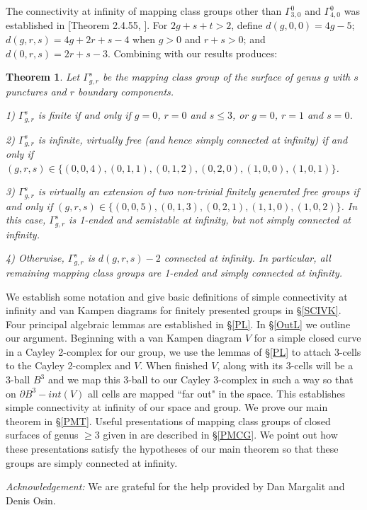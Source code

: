 \documentclass[12pt]{article}
\newtheorem{theorem}{Theorem}[section]
\numberwithin{equation}{section}
\begin{document}
 The connectivity at infinity of mapping class groups other than $\Gamma_{3,0}^0$ and $\Gamma_{4,0}^0$ was established in [Theorem 2.4.55, \cite{Man26}]. For $2g+s+t>2$, define $d(g,0,0)=4g-5$; $d(g,r,s)=4g+2r+s-4$ when $g>0$ and $r+s>0$; and $d(0,r,s)=2r+s-3$. Combining with our results produces:
 \begin{theorem}\label{MCGSCINF}
 Let $\Gamma_{g,r}^s$ be the mapping class group of the surface of genus $g$ with $s$ punctures and $r$ boundary components. 
 
1)  $\Gamma_{g,r}^s$ is finite if and only if $g=0$, $r=0$ and $s\leq 3$,  or $g=0$, $r=1$ and $s=0$. 



2) $\Gamma_{g,r}^s$ is infinite, virtually free (and hence simply connected at infinity) if and only if $(g,r,s) \in \{ (0,0,4), (0,1,1),  (0,1,2), (0,2,0), (1,0,0), (1,0,1) \}$. 

3) $\Gamma_{g,r}^s$ is virtually an extension of two non-trivial finitely generated free groups  if and only if $(g,r,s) \in \{(0,0,5), (0,1,3), (0,2,1), (1,1,0), (1,0,2) \}$. In this case, $\Gamma_{g,r}^s$ is 1-ended and semistable at infinity, but not simply connected at infinity. 

4) Otherwise, $\Gamma_{g,r}^s$ is $d(g,r,s)-2$ connected at infinity. In particular, all remaining mapping class groups are 1-ended and simply connected at infinity. 
 \end{theorem}
 We establish some notation and give basic definitions of simple connectivity at infinity and van Kampen diagrams for finitely presented groups in \S \ref{SCIVK}. 
 Four principal algebraic lemmas are established in \S \ref{PL}. In \S \ref{OutL} we outline our argument. Beginning with a van Kampen diagram $V$ for a simple closed curve in a Cayley 2-complex for our group, we use the lemmas of \S \ref{PL} to attach 3-cells to the Cayley 2-complex and $V$. When finished $V$, along with its 3-cells will be a 3-ball $B^3$ and we map this 3-ball to our Cayley 3-complex in such a way so that on $\partial B^3-int(V)$ all cells are mapped ``far out" in the space. This establishes simple connectivity at infinity of our space and group. We prove our main theorem in \S \ref{PMT}. Useful presentations of mapping class groups of closed surfaces of genus $\geq 3$ given in \cite{Ge01} are described in \S \ref{PMCG}. We point out how these presentations satisfy the hypotheses of our main theorem so that these groups are simply connected at infinity.
 
 {\it Acknowledgement:} We are grateful for the help provided by Dan Margalit and Denis Osin. 
 
\end{document}
